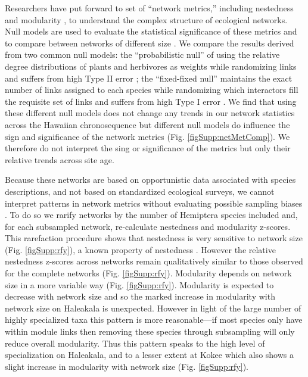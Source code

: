 \documentclass[12pt]{article}
\begin{document}
Researchers have put forward to set of ``network metrics,'' including
nestedness \citep{Bascompte2003, Ulrich2009} and modularity
\citep{Newman2004, Olesen2007}, to understand the complex structure of
ecological networks. Null models are used to evaluate the statistical
significance of these metrics and to compare between networks of
different size \cite{Ulrich2009}. We compare the results derived from
two common null models: the ``probabilistic null'' of
\cite{Bascompte2003} using the relative degree distributions of plants
and herbivores as weights while randomizing links and suffers from
high Type II error \citep{Ulrich2009}; the ``fixed-fixed null''
\citep{Ulrich2009} maintains the exact number of links assigned to
each species while randomizing which interactors fill the requisite set
of links and suffers from high Type I error \citep{Ulrich2009}. We find that
using these different null models does not change any trends in our
network statistics across the Hawaiian chronosequence but different
null models do influence the sign and significance of the network
metrics (Fig. \ref{figSupp:netMetComp}). We therefore do not interpret
the sing or significance of the metrics but only their relative trends
across site age.

Because these networks are based on opportunistic data associated with
species descriptions, and not based on standardized ecological
surveys, we cannot interpret patterns in network metrics without
evaluating possible sampling biases \citep{Nielsen2007, Gibson2011,
  Rivera2012}.  To do so we rarify networks by the number of Hemiptera
species included and, for each subsampled network, re-calculate
nestedness and modularity z-scores. This rarefaction procedure shows
that nestedness is very sensitive to network size
(Fig. \ref{figSupp:rfy}), a known property of nestedness
\citep{Nielsen2007, Gibson2011, Rivera2012}. However the relative
nestedness z-scores across networks remain qualitatively similar to
those observed for the complete networks (Fig. \ref{figSupp:rfy}).
Modularity depends on network size in a more variable way
(Fig. \ref{figSupp:rfy}). Modularity is expected to decrease with
network size \citep{Rivera2012} and so the marked increase in
modularity with network size on Haleakala is unexpected. However in
light of the large number of highly specialized taxa this pattern is
more reasonable---if most species only have within module links then
removing these species through subsampling will only reduce overall
modularity.  Thus this pattern speaks to the high level of
specialization on Haleakala, and to a lesser extent at Kokee which
also shows a slight increase in modularity with network size
(Fig. \ref{figSupp:rfy}).
\end{document}
